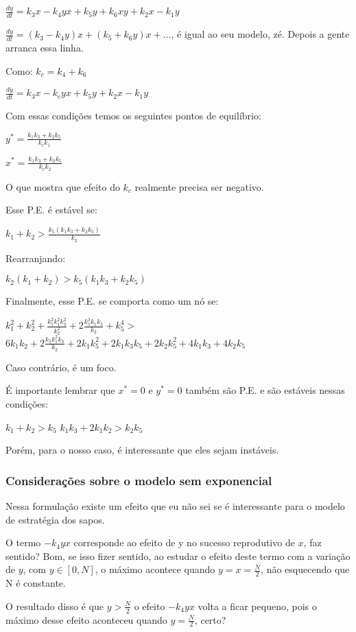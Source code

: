\vspace{3 mm}
$\frac{dy}{dt} = k_3 x - k_4 y x + k_5 y + k_6 x y + k_2 x - k_1 y$

\vspace{3 mm}
$\frac{dy}{dt} = (k_3 - k_4 y)x + (k_5 + k_6 y)x + \ldots$, é igual ao seu modelo, zé. Depois a gente arranca essa linha.

\vspace{3 mm}
Como: $k_c= k_4+k_6$

\vspace{3 mm}
$\frac{dy}{dt} = k_3 x - k_c y x + k_5 y + k_2 x - k_1 y$

Com essas condições temos os seguintes pontos de equilíbrio:

$y^* = \frac{k_1 k_3 + k_2 k_5}{k_c k_1}$

\vspace{3 mm}
$x^* = \frac{k_1 k_3 + k_2 k_5}{k_c k_2}$

O que mostra que efeito do $k_c$ realmente precisa ser negativo.

Esse P.E. é estável se:


$k_1 + k_2 > \frac{k_5(k_1 k_3 + k_2 k_5)}{k_2}$
\vspace{3 mm}

Rearranjando:

\vspace{3 mm}
$k_2(k_1 + k_2) > k_5(k_1 k_3 + k_2 k_5)$

Finalmente, esse P.E. se comporta como um nó se:

$k^2_1 + k_2^2 + \frac{k_5^2 k_1^2 k_3^2}{k_2^2} +2 \frac{k_5^3 k_1 k_3}{k_2} +k_5^4 > $
$ 6 k_1 k_2 + 2 \frac{k_5 k_1^2 k_3}{k_2} + 2 k_1 k_5^2 + 2k_1 k_3 k_5 + 2 k_2 k_5^2 + 4 k_1 k_3 + 4 k_2 k_5$ 

Caso contrário, é um foco.

É importante lembrar que $x^*=0$ e $y^*=0$ também são P.E. e são estáveis nessas condições:

\vspace{3 mm}
$k_1 + k_2 > k_5$
$k_1 k_3 + 2k_1 k_2 > k_2 k_5$

Porém, para o nosso caso, é interessante que eles sejam instáveis.

\subsubsection{Considerações sobre o modelo sem exponencial}
Nessa formulação existe um efeito que eu não sei se é interessante para o modelo de estratégia dos sapos.

O termo $-k_4 yx$ corresponde ao efeito de y no sucesso reprodutivo de $x$, faz sentido? Bom, se isso fizer sentido, ao estudar o efeito deste termo com a variação de $y$, com $y \in [0,N]$, o máximo acontece quando $y=x=\frac{N}{2}$, não esquecendo que N é constante.

O resultado disso é que $y > \frac{N}{2}$ o efeito $-k_4 yx$ volta a ficar pequeno, pois o máximo desse efeito aconteceu quando $y=\frac{N}{2}$, certo?